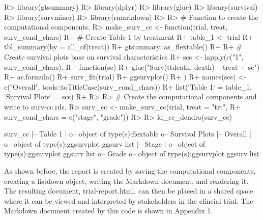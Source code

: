 \documentclass[
]{jss}
\begin{document}
\begin{CodeChunk}

\begin{CodeInput}
R> library(gtsummary)
R> library(dplyr)
R> library(glue)
R> library(survival)
R> library(survminer)
R> library(rmarkdown)
R> 
R> # Function to create the computational components.
R> make_surv_cc <- function(trial, treat, surv_cond_chars) {
R+   # Create Table 1 by treatment
R+   table_1 <- trial %
R+     tbl_summary(by = all_of(treat)) %
R+     gtsummary::as_flextable()
R+ 
R+   # Create survival plots base on survival characteristics
R+   scs <- lapply(c("1", surv_cond_chars),
R+                 function(sc) {
R+                   glue("Surv(ttdeath, death) ~ {treat} + {sc}") %
R+                     as.formula() %
R+                     surv_fit(trial) %
R+                     ggsurvplot()
R+                 })
R+   names(scs) <- c("Overall", tools::toTitleCase(surv_cond_chars))
R+   list(`Table 1` = table_1, `Survival Plots` = scs)
R+ }
R> 
R> # Create the computational components and write to surv-cc.rds.
R> surv_cc <- make_surv_cc(trial, treat = "trt",
R+                         surv_cond_chars = c("stage", "grade"))
R> 
R> ld_cc_dendro(surv_cc)
\end{CodeInput}

\begin{CodeOutput}

surv_cc
  |-- Table 1
  |  o-- object of type(s):flextable
  o-- Survival Plots
   |-- Overall
   |  o-- object of type(s):ggsurvplot ggsurv list
   |-- Stage
   |  o-- object of type(s):ggsurvplot ggsurv list
   o-- Grade
      o-- object of type(s):ggsurvplot ggsurv list
\end{CodeOutput}
\end{CodeChunk}

As shown before, the report is created by saving the computational
components, creating a listdown object, writing the 
Markdown document, and rendering it. The resulting document,
trial-report.html, can then be placed in a shared space where it can be
viewed and interpreted by stakeholders in the clincial trial. The
 Markdown document created by this code is shown in Appendix
1.
\end{document}
